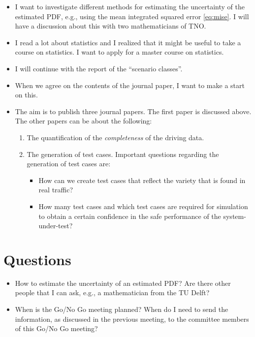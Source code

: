 \documentclass[10pt,final,a4paper,oneside,onecolumn]{article}
\begin{document}
\begin{itemize}
	\item I want to investigate different methods for estimating the uncertainty of the estimated PDF, e.g., using the mean integrated squared error \cref{eq:mise}. I will have a discussion about this with two mathematicians of TNO.
	\item I read a lot about statistics and I realized that it might be useful to take a course on statistics. I want to apply for a master course on statistics.
	\item I will continue with the report of the ``scenario classes''. 
	\item When we agree on the contents of the journal paper, I want to make a start on this.
	\item The aim is to publish three journal papers. The first paper is discussed above. The other papers can be about the following:
	\begin{enumerate}
		\item The quantification of the \emph{completeness} of the driving data.
		\item The generation of test cases. Important questions regarding the generation of test cases are:
		\begin{itemize}
			\item How can we create test cases that reflect the variety that is found in real traffic?
			\item How many test cases and which test cases are required for simulation to obtain a certain confidence in the safe performance of the system-under-test?
		\end{itemize}
	\end{enumerate}
\end{itemize}

\section{Questions}

\begin{itemize}
	\item How to estimate the uncertainty of an estimated PDF? Are there other people that I can ask, e.g., a mathematician from the TU Delft?
	\item When is the Go/No Go meeting planned? When do I need to send the information, as discussed in the previous meeting, to the committee members of this Go/No Go meeting?
\end{itemize}


\printbibliography

\newpage

\end{document}
